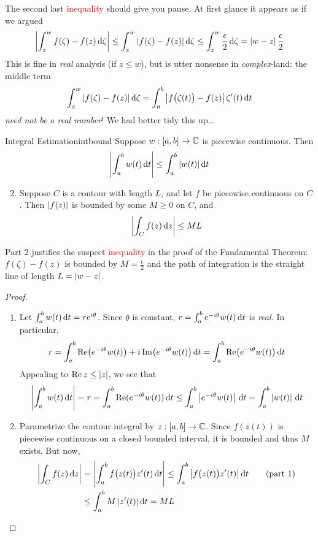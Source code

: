 
The second last \textcolor{red}{inequality} should give you pause. At first glance it appears as if we argued
\[
	\left| \int_z^wf(\zeta)-f(z)\,\mathrm{d}\zeta\right| \le \int_z^w\left| f(\zeta)-f(z)\right|\mathrm{d}\zeta \le \int_z^w\frac\epsilon 2\,\mathrm{d}\zeta =\left| w-z\right|\frac\epsilon 2
\]
This is fine in \emph{real} analysis (if $z\le w$), but is utter nonsense in \emph{complex}-land: the middle term
\[
	\int_z^w\left| f(\zeta)-f(z)\right|\mathrm{d}\zeta=\int_a^b\left| f\bigl(\zeta(t)\bigr)-f(z)\right|\zeta'(t)\,{\mathrm{d} t}
\]
\emph{need not be a real number}! We had better tidy this up\ldots

\goodbreak


\begin{thm}{Integral Estimation}{intbound}
	\exstart Suppose $w:[a,b]\to\mathbb{C}$ is piecewise continuous. Then
	\[
		\left| \int_a^bw(t)\,{\mathrm{d} t}\right|\le\int_a^b\left| w(t)\right|{\mathrm{d} t}
	\]
	\begin{enumerate}\setcounter{enumi}{1}
	  \item Suppose $C$ is a contour with length $L$, and let $f$ be piecewise continuous on $C$. Then $\left| f(z)\right|$ is bounded by some $M\ge 0$ on $C$, and 
		\[
			\left| \int_Cf(z)\,{\mathrm{d} z}\right|\le ML
		\]
	\end{enumerate}
\end{thm}

Part 2 justifies the suspect \textcolor{red}{inequality} in the proof of the Fundamental Theorem: $f(\zeta)-f(z)$ is bounded by $M=\frac\epsilon 2$ and the path of integration is the straight line of length $L=\left| w-z\right|$.


\begin{proof}
	\begin{enumerate}
	  \item Let $\int_a^bw(t)\,{\mathrm{d} t}=re^{i\theta}$. Since $\theta$ is constant, $r=\int_a^be^{-i\theta}w(t)\,{\mathrm{d} t}$ is \emph{real.} In particular,
		\[
			r=\int_a^b\operatorname{Re}\bigl(e^{-i\theta}w(t)\bigr)+i\operatorname{Im}\bigl(e^{-i\theta}w(t)\bigr)\,{\mathrm{d} t}
			=\int_a^b\operatorname{Re}\bigl(e^{-i\theta}w(t)\bigr)\,{\mathrm{d} t}
		\]
		Appealing to $\operatorname{Re} z\le\left| z\right|$, we see that
		\[
			\left| \int_a^bw(t)\,{\mathrm{d} t}\right|
			=r =\int_a^b\operatorname{Re}(e^{-i\theta}w(t))\,{\mathrm{d} t}
			\le \int_a^b\left| e^{-i\theta}w(t)\right|\,{\mathrm{d} t}
			=\int_a^b\left| w(t)\right|\,{\mathrm{d} t}
		\]
		\item Parametrize the contour integral by $z:[a,b]\to\mathbb{C}$. Since $f(z(t))$ is piecewise continuous on a closed bounded interval, it is bounded and thus $M$ exists. But now,
		\begin{align*}
			\left| \int_Cf(z)\,{\mathrm{d} z}\right|
			&=\left| \int_a^bf\bigl(z(t)\bigr)z'(t)\,{\mathrm{d} t}\right|\le \int_a^b\left| f\bigl(z(t)\bigr)z'(t)\right|{\mathrm{d} t} \tag{part 1}\\
			&\le \int_a^bM\left| z'(t)\right|{\mathrm{d} t}
			=ML \tag*{\qedhere}
		\end{align*}
	\end{enumerate}
\end{proof}

